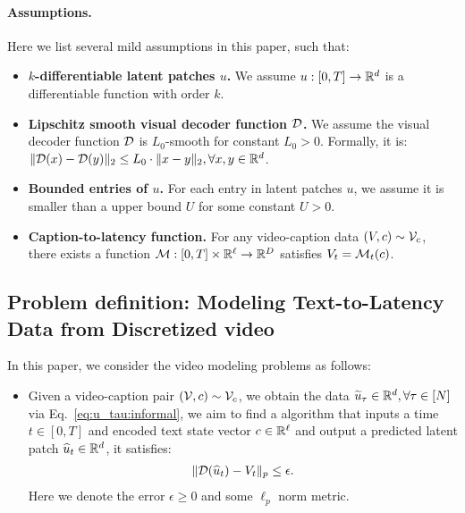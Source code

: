 \paragraph{Assumptions.} Here we list several mild assumptions in this paper, such that:
\begin{itemize}
    \item {\bf $k$-differentiable latent patches $u$. } We assume $u: [0, T] \rightarrow \R^d$ is a differentiable function with order $k$. 
    \item {\bf Lipschitz smooth visual decoder function ${\cal D}$. } We assume the visual decoder function ${\cal D}$ is $L_0$-smooth for constant $L_0 > 0$. Formally, it is: $\| {\cal D}(x) - {\cal D}(y) \|_2 \leq L_0 \cdot \| x - y\|_2, \forall x, y \in \R^d$.
    \item {\bf Bounded entries of $u$.} For each entry in latent patches $u$, we assume it is smaller than a upper bound $U$ for some constant $U > 0$.
    \item {\bf Caption-to-latency function. } For any video-caption data $(V, c) \sim {\cal V}_c$, there exists a function ${\cal M}: [0, T] \times \R^\ell \rightarrow \R^D$ satisfies $V_t = {\cal M}_t(c)$. 
\end{itemize}


\subsection{Problem definition: Modeling Text-to-Latency Data from Discretized video}\label{sub:problem_def}

In this paper, we consider the video modeling problems as follows:
\begin{itemize}
    \item 
    Given a video-caption pair $({\cal V}, c) \sim {\cal V}_c$, we obtain the data $\wt{u}_\tau \in \R^d, \forall \tau \in [N]$ via Eq.~\eqref{eq:u_tau:informal}, we aim to find a algorithm that inputs a time $t \in [0, T]$ and encoded text state vector $c \in \R^{\ell}$ and output a predicted latent patch $\hat{u}_t \in \R^d$, it satisfies: 
    \begin{align}\label{eq:main}
        \| {\cal D}(\hat{u}_t) - V_t \|_p \leq \epsilon.
    \end{align}
    Here we denote the error $\epsilon \ge 0$ and some $\ell_p$ norm metric.
\end{itemize}

